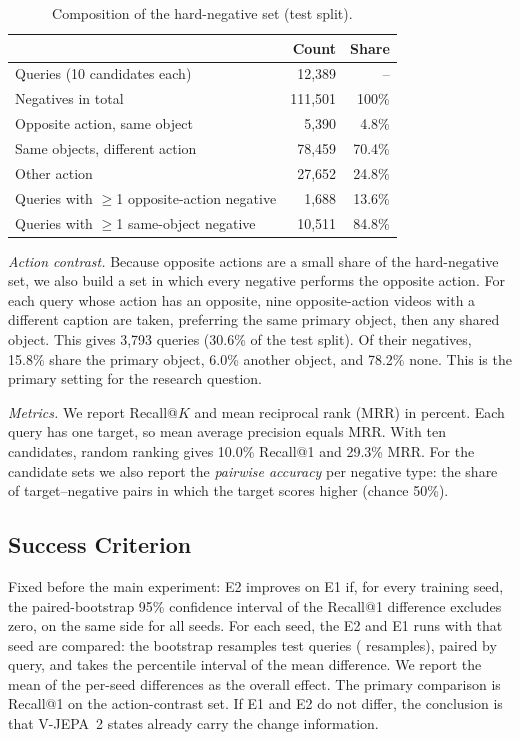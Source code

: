 \documentclass[lettersize,journal]{IEEEtran}
\begin{document}
\begin{table}[!t]
\caption{Composition of the hard-negative set (test split).}
\label{tab:hardneg}
\centering
\begin{tabular}{lrr}
\toprule
 & Count & Share \\
\midrule
Queries (10 candidates each) & 12{,}389 & -- \\
Negatives in total & 111{,}501 & 100\% \\
\quad Opposite action, same object & 5{,}390 & 4.8\% \\
\quad Same objects, different action & 78{,}459 & 70.4\% \\
\quad Other action & 27{,}652 & 24.8\% \\
\midrule
Queries with $\geq$1 opposite-action negative & 1{,}688 & 13.6\% \\
Queries with $\geq$1 same-object negative & 10{,}511 & 84.8\% \\
\bottomrule
\end{tabular}
\end{table}

\emph{Action contrast.} Because opposite actions are a small share of the
hard-negative set, we also build a set in which every negative performs the
opposite action. For each query whose action has an opposite, nine
opposite-action videos with a different caption are taken, preferring the same
primary object, then any shared object. This gives 3{,}793 queries (30.6\% of
the test split). Of their negatives, 15.8\% share the primary object, 6.0\%
another object, and 78.2\% none. This is the primary setting for the research
question.

\emph{Metrics.} We report Recall@$K$ and mean reciprocal rank (MRR) in percent.
Each query has one target, so mean average precision equals MRR. With ten
candidates, random ranking gives 10.0\% Recall@1 and 29.3\% MRR. For the
candidate sets we also report the \emph{pairwise accuracy} per negative type:
the share of target--negative pairs in which the target scores higher (chance
50\%).

\subsection{Success Criterion}
Fixed before the main experiment: E2 improves on E1 if, for every training
seed, the paired-bootstrap 95\% confidence interval of the Recall@1 difference
excludes zero, on the same side for all seeds. For each seed, the E2 and E1 runs
with that seed are compared: the bootstrap resamples test queries
(\BootstrapSamples{} resamples), paired by query, and takes the percentile
interval of the mean difference. We report the mean of the per-seed
differences as the overall effect. The primary comparison is
Recall@1 on the action-contrast set. If E1 and E2 do not differ, the
conclusion is that V-JEPA~2 states already carry the change information.
\end{document}
